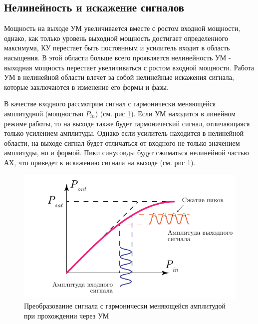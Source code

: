 \subsection{Нелинейность и искажение сигналов}
Мощность на выходе УМ увеличивается вместе с ростом входной мощности,
однако, как только уровень выходной мощность достигает определенного
максимума, КУ перестает быть постоянным и усилитель входит в область
насыщения. В этой области больше всего проявляется нелинейность УМ -
выходная мощность перестает увеличиваться с ростом входной мощности. Работа
УМ в нелинейной области влечет за собой нелинейные искажения сигнала,
которые заключаются в изменение его формы и фазы.

В качестве входного рассмотрим сигнал с гармонически меняющейся амплитудной
(мощностью $P_{in}$) (см. рис \ref{fig:pa_distortion_sin}). Если УМ
находится в линейном режиме работы, то на выходе также будет гармонический
сигнал, отличающаяся только усилением амплитуды. Однако если усилитель
находится в нелинейной области, на выходе сигнал будет отличаться от
входного не только значением амплитуды, но и формой. Пики синусоиды будут
сжиматься нелинейной частью АХ, что приведет к искажению сигнала на выходе
(см. рис \ref{fig:pa_distortion_sin}).

\begin{figure}[h!]
    \centering
    \includegraphics[scale=1.2]{figs/amp_dist.pdf}
    \caption{Преобразование сигнала с гармонически меняющейся амплитудой при прохождении через УМ}
    \label{fig:pa_distortion_sin}
\end{figure}



